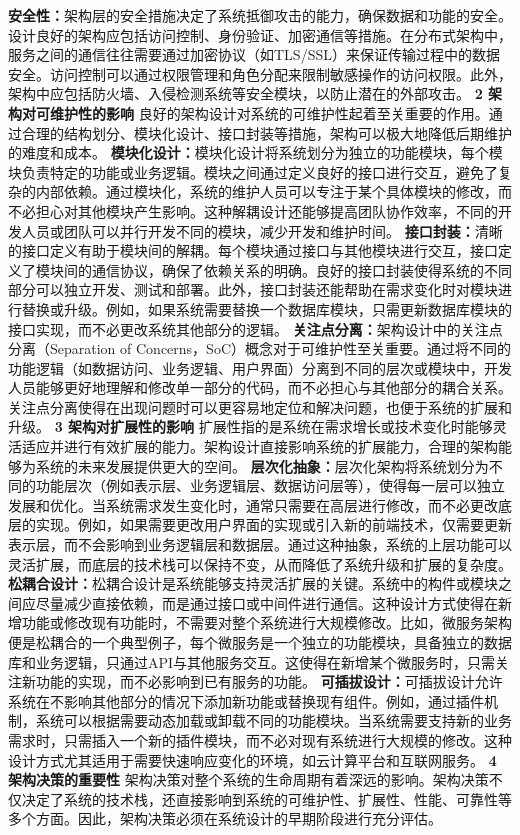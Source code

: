 \textbf{安全性：}架构层的安全措施决定了系统抵御攻击的能力，确保数据和功能的安全。设计良好的架构应包括访问控制、身份验证、加密通信等措施。在分布式架构中，服务之间的通信往往需要通过加密协议（如TLS/SSL）来保证传输过程中的数据安全。访问控制可以通过权限管理和角色分配来限制敏感操作的访问权限。此外，架构中应包括防火墙、入侵检测系统等安全模块，以防止潜在的外部攻击。 \textbf{2 架构对可维护性的影响} 良好的架构设计对系统的可维护性起着至关重要的作用。通过合理的结构划分、模块化设计、接口封装等措施，架构可以极大地降低后期维护的难度和成本。 \textbf{模块化设计：}模块化设计将系统划分为独立的功能模块，每个模块负责特定的功能或业务逻辑。模块之间通过定义良好的接口进行交互，避免了复杂的内部依赖。通过模块化，系统的维护人员可以专注于某个具体模块的修改，而不必担心对其他模块产生影响。这种解耦设计还能够提高团队协作效率，不同的开发人员或团队可以并行开发不同的模块，减少开发和维护时间。 \textbf{接口封装：}清晰的接口定义有助于模块间的解耦。每个模块通过接口与其他模块进行交互，接口定义了模块间的通信协议，确保了依赖关系的明确。良好的接口封装使得系统的不同部分可以独立开发、测试和部署。此外，接口封装还能帮助在需求变化时对模块进行替换或升级。例如，如果系统需要替换一个数据库模块，只需更新数据库模块的接口实现，而不必更改系统其他部分的逻辑。 \textbf{关注点分离：}架构设计中的关注点分离（Separation of Concerns，SoC）概念对于可维护性至关重要。通过将不同的功能逻辑（如数据访问、业务逻辑、用户界面）分离到不同的层次或模块中，开发人员能够更好地理解和修改单一部分的代码，而不必担心与其他部分的耦合关系。关注点分离使得在出现问题时可以更容易地定位和解决问题，也便于系统的扩展和升级。 \textbf{3 架构对扩展性的影响} 扩展性指的是系统在需求增长或技术变化时能够灵活适应并进行有效扩展的能力。架构设计直接影响系统的扩展能力，合理的架构能够为系统的未来发展提供更大的空间。 \textbf{层次化抽象：}层次化架构将系统划分为不同的功能层次（例如表示层、业务逻辑层、数据访问层等），使得每一层可以独立发展和优化。当系统需求发生变化时，通常只需要在高层进行修改，而不必更改底层的实现。例如，如果需要更改用户界面的实现或引入新的前端技术，仅需要更新表示层，而不会影响到业务逻辑层和数据层。通过这种抽象，系统的上层功能可以灵活扩展，而底层的技术栈可以保持不变，从而降低了系统升级和扩展的复杂度。 \textbf{松耦合设计：}松耦合设计是系统能够支持灵活扩展的关键。系统中的构件或模块之间应尽量减少直接依赖，而是通过接口或中间件进行通信。这种设计方式使得在新增功能或修改现有功能时，不需要对整个系统进行大规模修改。比如，微服务架构便是松耦合的一个典型例子，每个微服务是一个独立的功能模块，具备独立的数据库和业务逻辑，只通过API与其他服务交互。这使得在新增某个微服务时，只需关注新功能的实现，而不必影响到已有服务的功能。 \textbf{可插拔设计：}可插拔设计允许系统在不影响其他部分的情况下添加新功能或替换现有组件。例如，通过插件机制，系统可以根据需要动态加载或卸载不同的功能模块。当系统需要支持新的业务需求时，只需插入一个新的插件模块，而不必对现有系统进行大规模的修改。这种设计方式尤其适用于需要快速响应变化的环境，如云计算平台和互联网服务。 \textbf{4 架构决策的重要性} 架构决策对整个系统的生命周期有着深远的影响。架构决策不仅决定了系统的技术栈，还直接影响到系统的可维护性、扩展性、性能、可靠性等多个方面。因此，架构决策必须在系统设计的早期阶段进行充分评估。 